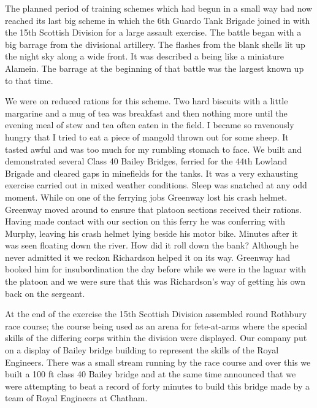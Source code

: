 The planned period of training schemes which had begun in a small way
had now reached its last big scheme in which the 6th Guardo Tank
Brigade joined in with the 15th Scottish Division for a large
assault exercise. The battle began with a big barrage from the
divisional artillery. The flashes from the blank shells lit up
the night sky along a wide front. It was described a being like a
miniature Alamein. The barrage at the beginning of that battle was the
largest known up to that time.

We were on reduced rations for this scheme. Two hard biscuits with a
little margarine and a mug of tea was breakfast and then nothing more
until the evening meal of stew and tea often eaten in the field. I
became so ravenously hungry that I tried to eat a piece of mangold
thrown out for some sheep. It tasted awful and was too much for my
rumbling stomach to face. We built and demonstrated several Class 40
Bailey Bridges, ferried for the 44th Lowland Brigade and cleared gaps
in minefields for the tanks. It was a very exhausting exercise carried
out in mixed weather conditions. Sleep was snatched at any odd
moment. While on one of the ferrying jobs \sergeant Greenway lost his
crash helmet. \Sergeant Greenway moved around to ensure that platoon
sections received their rations. Having made contact with our section
on this ferry he was conferring with \corporal Murphy, leaving his crash
helmet lying beside his motor bike. Minutes after it was seen floating
down the river. How did it roll down the bank? Although he never
admitted it we reckon \sapper Richardson helped it on its way. \Sergeant
Greenway had booked him for insubordination the day before while we
were in the laguar with the platoon and we were sure that this was
Richardson's way of getting his own back on the sergeant.

At the end of the exercise the 15th Scottish Division assembled round
Rothbury race course; the course being used as an arena for
fete-at-arms where the special skills of the differing corps within
the division were displayed. Our company put on a display of Bailey
bridge building to represent the skills of the Royal Engineers. There
was a small stream running by the race course and over this we built a
100 ft class 40 Bailey bridge and at the same time announced that we were
attempting to beat a record of forty minutes to build this bridge made
by a team of Royal Engineers at Chatham.

